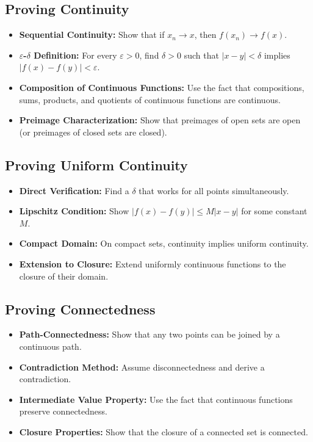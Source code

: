 \subsection*{Proving Continuity}

\begin{itemize}
\item \textbf{Sequential Continuity:} Show that if $x_n \to x$, then $f(x_n) \to f(x)$.

\item \textbf{$\varepsilon$-$\delta$ Definition:} For every $\varepsilon > 0$, find $\delta > 0$ such that $|x - y| < \delta$ implies $|f(x) - f(y)| < \varepsilon$.

\item \textbf{Composition of Continuous Functions:} Use the fact that compositions, sums, products, and quotients of continuous functions are continuous.

\item \textbf{Preimage Characterization:} Show that preimages of open sets are open (or preimages of closed sets are closed).
\end{itemize}

\subsection*{Proving Uniform Continuity}

\begin{itemize}
\item \textbf{Direct Verification:} Find a $\delta$ that works for all points simultaneously.

\item \textbf{Lipschitz Condition:} Show $|f(x) - f(y)| \leq M|x - y|$ for some constant $M$.

\item \textbf{Compact Domain:} On compact sets, continuity implies uniform continuity.

\item \textbf{Extension to Closure:} Extend uniformly continuous functions to the closure of their domain.
\end{itemize}

\subsection*{Proving Connectedness}

\begin{itemize}
\item \textbf{Path-Connectedness:} Show that any two points can be joined by a continuous path.

\item \textbf{Contradiction Method:} Assume disconnectedness and derive a contradiction.

\item \textbf{Intermediate Value Property:} Use the fact that continuous functions preserve connectedness.

\item \textbf{Closure Properties:} Show that the closure of a connected set is connected.
\end{itemize}

